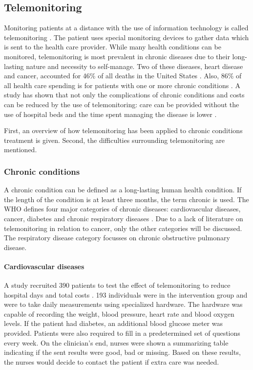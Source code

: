     \subsection{Telemonitoring} \label{2_telemonitoring}
    Monitoring patients at a distance with the use of information technology is called telemonitoring \cite{systematic_review}. The patient uses special monitoring devices to gather data which is sent to the health care provider. While many health conditions can be monitored, telemonitoring is most prevalent in chronic diseases due to their long-lasting nature and necessity to self-manage. Two of these diseases, heart disease and cancer, accounted for 46\% of all deaths in the United States \cite{national2016health}. Also, 86\% of all health care spending is for patients with one or more chronic conditions \cite{gerteis2014multiple}. A study has shown that not only the complications of chronic conditions and costs can be reduced by the use of telemonitoring: care can be provided without the use of hospital beds and the time spent managing the disease is lower \cite{telemonitoring_current_state}.

    First, an overview of how telemonitoring has been applied to chronic conditions treatment is given. Second, the difficulties surrounding telemonitoring are mentioned.

        \subsubsection{Chronic conditions}

        A chronic condition can be defined as a long-lasting human health condition. If the length of the condition is at least three months, the term chronic is used. The WHO defines four major categories of chronic diseases: cardiovascular diseases, cancer, diabetes and chronic respiratory diseases \cite{world2017noncommunicable}. Due to a lack of literature on telemonitoring in relation to cancer, only the other categories will be discussed. The respiratory disease category focusses on chronic obstructive pulmonary disease.

        \paragraph{Cardiovascular diseases} A study recruited 390 patients to test the effect of telemonitoring to reduce hospital days and total costs \cite{tompkins2010randomized}. 193 individuals were in the intervention group and were to take daily measurements using specialized hardware. The hardware was capable of recording the weight, blood pressure, heart rate and blood oxygen levels. If the patient had diabetes, an additional blood glucose meter was provided. Patients were also required to fill in a predetermined set of questions every week. On the clinician's end, nurses were shown a summarizing table indicating if the sent results were good, bad or missing. Based on these results, the nurses would decide to contact the patient if extra care was needed.

